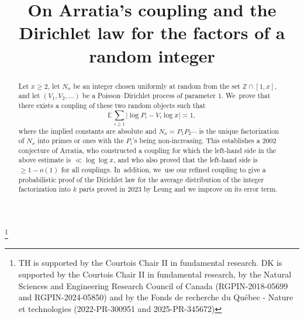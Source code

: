 \documentclass[JEP,XML,SOM,Unicode,published]{cedram}
\theoremstyle{plain}
\theoremstyle{definition}
\begin{document}
\frontmatter

\title[On Arratia's coupling and the Dirichlet law for factorizations]{On Arratia's coupling and the Dirichlet law for the factors of a random integer}

\author[\initial{T.} \lastname{Haddad}]{ }
\address{Département de mathématiques et de statistique, Université de Montréal,\\
CP 6128 succ. Centre-Ville, Montréal, QC H3C 3J7, Canada}

\author[\initial{D.} \lastname{Koukoulopoulos}]{ }
\address{Département de mathématiques et de statistique, Université de Montréal,\\
CP 6128 succ. Centre-Ville, Montréal, QC H3C 3J7, Canada}

\thanks{TH is supported by the Courtois Chair II in fundamental research. DK is supported by the Courtois Chair II in fundamental research, by the Natural Sciences and Engineering Research Council of Canada (RGPIN-2018-05699 and RGPIN-2024-05850) and by the Fonds de recherche du Québec - Nature et technologies (2022-PR-300951 and 2025-PR-345672)}

\begin{abstract}
Let $x\ge2$, let $N_x$ be an integer chosen uniformly at random from the set $\mathbb{Z} \cap [1, x]$, and let $(V_1, V_2, \ldots)$ be a Poisson--Dirichlet process of parameter $1$. We~prove that there exists a coupling of these two random objects such that
\[
\mathbb{E}\, \sum_{i \ge 1} \big|{\log P_i- V_i\log x}\big| \asymp 1,
\]
where the implied constants are absolute and $N_x = P_1P_2 \cdots$ is the unique factorization of $N_x$ into primes or ones with the $P_i$'s being non-increasing. This establishes a 2002 conjecture of Arratia, who constructed a coupling for which the left-hand side in the above estimate is $\ll\log\!\log x$, and who also proved that the left-hand side is $\ge 1-o(1)$ for all couplings. In~addition, we~use our refined coupling to give a probabilistic proof of the Dirichlet law for the average distribution of the integer factorization into $k$ parts proved in 2023 by Leung and we improve on its error term.
\end{abstract}


\end{document}
